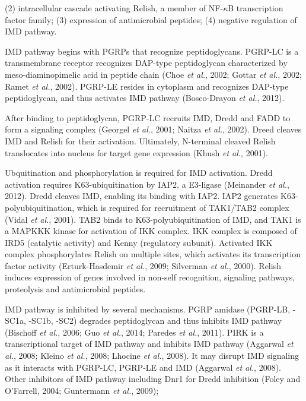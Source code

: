 \documentclass[11pt]{article}
\begin{document}
\begin{sloppypar}
(2) intracellular cascade activating Relish, a member of NF-$\kappa$B transcription factor family; 
(3) expression of antimicrobial peptides; 
(4) negative regulation of IMD pathway. 
\par
IMD pathway begins with PGRPs that recognize peptidoglycans. 
PGRP-LC is a transmembrane receptor recognizes DAP-type peptidoglycan characterized by meso-diaminopimelic acid in peptide chain (Choe \textit{et al.}, 2002; Gottar \textit{et al.}, 2002; Ramet \textit{et al.}, 2002). 
PGRP-LE resides in cytoplasm and recognizes DAP-type peptidoglycan, and thus activates IMD pathway (Bosco-Drayon \textit{et al.}, 2012). 
\par
After binding to peptidoglycan, PGRP-LC recruits IMD, Dredd and FADD to form a signaling complex (Georgel \textit{et al.}, 2001; Naitza \textit{et al.}, 2002). 
Dreed cleaves IMD and Relish for their activation. 
Ultimately, N-terminal cleaved Relish translocates into nucleus for target gene expression (Khush \textit{et al.}, 2001). 
\par
Ubquitination and phosphorylation is required for IMD activation. 
Dredd activation requires K63-ubiquitination by IAP2, a E3-ligase (Meinander \textit{et al.}, 2012). 
Dredd cleaves IMD, enabling its binding with IAP2. 
IAP2 generates K63-polyubiquitination, which is required for recruitment of TAK1/TAB2 complex (Vidal \textit{et al.}, 2001). 
TAB2 binds to K63-polyubiquitination of IMD, and TAK1 is a MAPKKK kinase for activation of IKK complex. 
IKK complex is composed of IRD5 (catalytic activity) and Kenny (regulatory subunit). 
Activated IKK complex phosphorylates Relish on multiple sites, which activates its transcription factor activity (Erturk-Hasdemir \textit{et al.}, 2009; Silverman \textit{et al.}, 2000). 
Relish induces expression of genes involved in non-self recognition, signaling pathways, proteolysis and antimicrobial peptides. 
\par
IMD pathway is inhibited by several mechanisms. 
PGRP amidase (PGRP-LB, -SC1a, -SC1b, -SC2) degrades peptidoglycan and thus inhibits IMD pathway (Bischoff \textit{et al.}, 2006; Guo \textit{et al.}, 2014; Paredes \textit{et al.}, 2011). 
PIRK is a transcriptional target of IMD pathway and inhibits IMD pathway (Aggarwal \textit{et al.}, 2008; Kleino \textit{et al.}, 2008; Lhocine \textit{et al.}, 2008). 
It may disrupt IMD signaling as it interacts with PGRP-LC, PGRP-LE and IMD (Aggarwal \textit{et al.}, 2008). 
Other inhibitors of IMD pathway including 
Dnr1 for Dredd inhibition (Foley and O'Farrell, 2004; Guntermann \textit{et al.}, 2009); 

\end{sloppypar}
\end{document}
